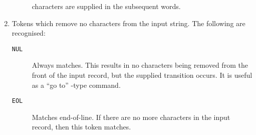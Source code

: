 \begin{enumerate}
\begin{description}
characters are supplied in the subsequent words.
\end{description}
\item Tokens which remove no characters from the input string.
The following are recognised:
\begin{description}
\item[{\tt NUL}]     Always matches. This results in no characters being
removed from the front of the input record, but
the supplied transition occurs. It is useful as a
``go to'' -type command.
\item[{\tt EOL}]         Matches end-of-line. 
If there are no more characters
in the input record, then this token matches.
\end{description}
\end{enumerate}

